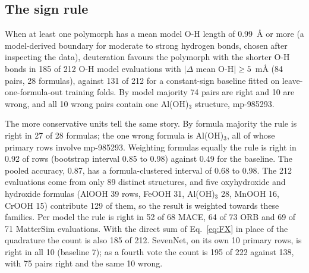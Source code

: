 \documentclass[aps,prmaterials,reprint,superscriptaddress,nofootinbib]{revtex4-2}
\begin{document}
\subsection{The sign rule}
\label{sec:sign}

When at least one polymorph has a mean model O-H length of 0.99~\AA{} or more (a model-derived boundary for moderate to strong hydrogen bonds, chosen after inspecting the data), deuteration favours the polymorph with the shorter O-H bonds in 185 of 212 O-H model evaluations with $|\Delta$ mean O-H$|\geq5$~m\AA{} (84 pairs, 28 formulas), against 131 of 212 for a constant-sign baseline fitted on leave-one-formula-out training folds. By model majority 74 pairs are right and 10 are wrong, and all 10 wrong pairs contain one Al(OH)$_3$ structure, mp-985293.

The more conservative units tell the same story. By formula majority the rule is right in 27 of 28 formulas; the one wrong formula is Al(OH)$_3$, all of whose primary rows involve mp-985293. Weighting formulas equally the rule is right in 0.92 of rows (bootstrap interval 0.85 to 0.98) against 0.49 for the baseline. The pooled accuracy, 0.87, has a formula-clustered interval of 0.68 to 0.98. The 212 evaluations come from only 89 distinct structures, and five oxyhydroxide and hydroxide formulas (AlOOH 39 rows, FeOOH 31, Al(OH)$_3$ 28, MnOOH 16, CrOOH 15) contribute 129 of them, so the result is weighted towards these families. Per model the rule is right in 52 of 68 MACE, 64 of 73 ORB and 69 of 71 MatterSim evaluations. With the direct sum of Eq.~\eqref{eq:FX} in place of the quadrature the count is also 185 of 212. SevenNet, on its own 10 primary rows, is right in all 10 (baseline 7); as a fourth vote the count is 195 of 222 against 138, with 75 pairs right and the same 10 wrong.
\end{document}
